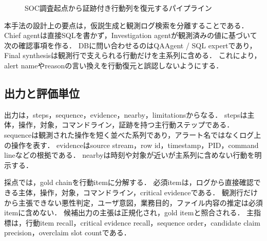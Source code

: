 \documentclass[dvipdfmx]{FITpaper}
\newcommand{\field}[1]{\mbox{\textrm{#1}}}
\begin{document}
\begin{figure}[ht]
    \centering
    \caption{SOC調査起点から証跡付き行動列を復元するパイプライン}
    \label{figure:pipeline}
\end{figure}

本手法の設計上の要点は，仮説生成と観測ログ検索を分離することである．
Chief agentは直接SQLを書かず，Investigation agentが観測済みの値に基づいて次の確認事項を作る．
DBに問い合わせるのはQAAgent / SQL expertであり，Final synthesisは観測行で支えられる行動だけを主系列に含める．
これにより，alert nameやreasonの言い換えを行動復元と誤認しないようにする．

\subsection{出力と評価単位}

出力は，\field{steps}，\field{sequence}，\field{evidence}，\field{nearby}，\field{limitations}からなる．
\field{steps}は主体，操作，対象，コマンドライン，証跡を持つ主行動ステップである．
\field{sequence}は観測された操作を短く並べた系列であり，アラート名ではなくログ上の操作を表す．
\field{evidence}はsource stream，row id，timestamp，PID，command lineなどの根拠である．
\field{nearby}は時刻や対象が近いが主系列に含めない行動を明示する．

採点では，gold chainを行動itemに分解する．
必須itemは，ログから直接確認できる主体，操作，対象，コマンドライン，critical evidenceである．
観測行だけから主張できない悪性判定，ユーザ意図，業務目的，ファイル内容の推定は必須itemに含めない．
候補出力の主張は正規化され，gold itemと照合される．
主指標は，行動item recall，critical evidence recall，sequence order，candidate claim precision，overclaim slot countである．
\end{document}
